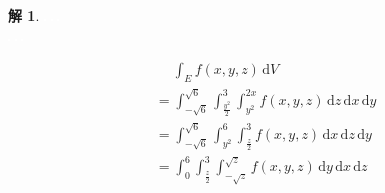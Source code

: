\documentclass[12pt]{extarticle}
\theoremstyle{definition}
\newtheorem*{sol}{解}
\begin{document}
{\begin{sol}
  \begin{minipage}{0.6\textwidth}
    \includegraphics[scale=0.82,page=23]{fig/prob.pdf} 
    \includegraphics[scale=0.82,page=24]{fig/prob.pdf} 
    \includegraphics[scale=0.82,page=25]{fig/prob.pdf} \\
    \includegraphics[scale=0.88,page=26]{fig/prob.pdf} 
    \includegraphics[scale=0.65,page=27]{fig/prob.pdf} 
    \includegraphics[scale=0.7,page=28]{fig/prob.pdf} 
  \end{minipage}
  \begin{minipage}{0.4\textwidth}
    \begin{align*}
      &\quad\;\int_E f(x, y, z)\,\text{d}V \\
      &= \int_{-\sqrt{6}}^{\sqrt{6}}\int_{\frac{y^2}{2}}^{3}\!\int_{y^2}^{2x}\!\!f(x, y, z)\,\text{d}z\,\text{d}x\,\text{d}y \\
      &= \int_{-\sqrt{6}}^{\sqrt{6}}\int_{y^2}^{6}\!\!\int_{\frac{z}{2}}^3\!\!f(x, y, z)\,\text{d}x\,\text{d}z\,\text{d}y \\
      &= \int_0^6\!\!\int_{\frac{z}{2}}^{3}\!\!\int_{-\sqrt{z}}^{\sqrt{z}}\!\!f(x, y, z)\,\text{d}y\,\text{d}x\,\text{d}z
    \end{align*}
  \end{minipage}
\end{sol}

}
\end{document}
